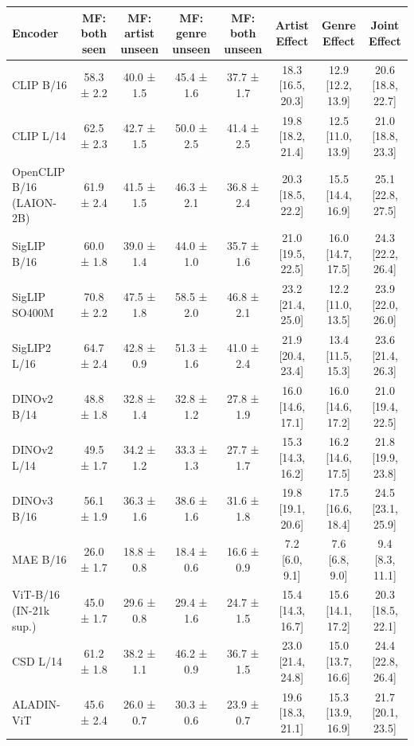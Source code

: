 \begin{tabular}{lccccccc}
\toprule
Encoder & MF: both seen & MF: artist unseen & MF: genre unseen & MF: both unseen & Artist Effect & Genre Effect & Joint Effect \\
\midrule
CLIP B/16 & 58.3 ± 2.2 & 40.0 ± 1.5 & 45.4 ± 1.6 & 37.7 ± 1.7 & 18.3 [16.5, 20.3] & 12.9 [12.2, 13.9] & 20.6 [18.8, 22.7] \\
CLIP L/14 & 62.5 ± 2.3 & 42.7 ± 1.5 & 50.0 ± 2.5 & 41.4 ± 2.5 & 19.8 [18.2, 21.4] & 12.5 [11.0, 13.9] & 21.0 [18.8, 23.3] \\
OpenCLIP B/16 (LAION-2B) & 61.9 ± 2.4 & 41.5 ± 1.5 & 46.3 ± 2.1 & 36.8 ± 2.4 & 20.3 [18.5, 22.2] & 15.5 [14.4, 16.9] & 25.1 [22.8, 27.5] \\
SigLIP B/16 & 60.0 ± 1.8 & 39.0 ± 1.4 & 44.0 ± 1.0 & 35.7 ± 1.6 & 21.0 [19.5, 22.5] & 16.0 [14.7, 17.5] & 24.3 [22.2, 26.4] \\
SigLIP SO400M & 70.8 ± 2.2 & 47.5 ± 1.8 & 58.5 ± 2.0 & 46.8 ± 2.1 & 23.2 [21.4, 25.0] & 12.2 [11.0, 13.5] & 23.9 [22.0, 26.0] \\
SigLIP2 L/16 & 64.7 ± 2.4 & 42.8 ± 0.9 & 51.3 ± 1.6 & 41.0 ± 2.4 & 21.9 [20.4, 23.4] & 13.4 [11.5, 15.3] & 23.6 [21.4, 26.3] \\
DINOv2 B/14 & 48.8 ± 1.8 & 32.8 ± 1.4 & 32.8 ± 1.2 & 27.8 ± 1.9 & 16.0 [14.6, 17.1] & 16.0 [14.6, 17.2] & 21.0 [19.4, 22.5] \\
DINOv2 L/14 & 49.5 ± 1.7 & 34.2 ± 1.2 & 33.3 ± 1.3 & 27.7 ± 1.7 & 15.3 [14.3, 16.2] & 16.2 [14.6, 17.5] & 21.8 [19.9, 23.8] \\
DINOv3 B/16 & 56.1 ± 1.9 & 36.3 ± 1.6 & 38.6 ± 1.6 & 31.6 ± 1.8 & 19.8 [19.1, 20.6] & 17.5 [16.6, 18.4] & 24.5 [23.1, 25.9] \\
MAE B/16 & 26.0 ± 1.7 & 18.8 ± 0.8 & 18.4 ± 0.6 & 16.6 ± 0.9 & 7.2 [6.0, 9.1] & 7.6 [6.8, 9.0] & 9.4 [8.3, 11.1] \\
ViT-B/16 (IN-21k sup.) & 45.0 ± 1.7 & 29.6 ± 0.8 & 29.4 ± 1.6 & 24.7 ± 1.5 & 15.4 [14.3, 16.7] & 15.6 [14.1, 17.2] & 20.3 [18.5, 22.1] \\
CSD L/14 & 61.2 ± 1.8 & 38.2 ± 1.1 & 46.2 ± 0.9 & 36.7 ± 1.5 & 23.0 [21.4, 24.8] & 15.0 [13.7, 16.6] & 24.4 [22.8, 26.4] \\
ALADIN-ViT & 45.6 ± 2.4 & 26.0 ± 0.7 & 30.3 ± 0.6 & 23.9 ± 0.7 & 19.6 [18.3, 21.1] & 15.3 [13.9, 16.9] & 21.7 [20.1, 23.5] \\
\bottomrule
\end{tabular}
